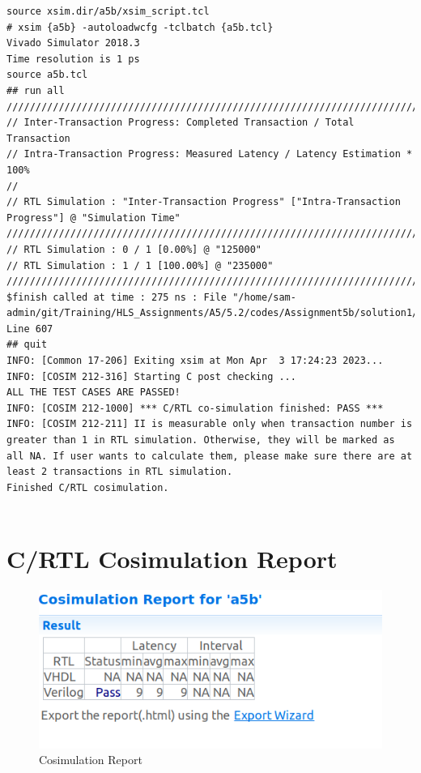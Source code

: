 \documentclass{article}
\begin{document}
\begin{lstlisting}
source xsim.dir/a5b/xsim_script.tcl
# xsim {a5b} -autoloadwcfg -tclbatch {a5b.tcl}
Vivado Simulator 2018.3
Time resolution is 1 ps
source a5b.tcl
## run all
////////////////////////////////////////////////////////////////////////////////////
// Inter-Transaction Progress: Completed Transaction / Total Transaction
// Intra-Transaction Progress: Measured Latency / Latency Estimation * 100%
//
// RTL Simulation : "Inter-Transaction Progress" ["Intra-Transaction Progress"] @ "Simulation Time"
////////////////////////////////////////////////////////////////////////////////////
// RTL Simulation : 0 / 1 [0.00%] @ "125000"
// RTL Simulation : 1 / 1 [100.00%] @ "235000"
////////////////////////////////////////////////////////////////////////////////////
$finish called at time : 275 ns : File "/home/sam-admin/git/Training/HLS_Assignments/A5/5.2/codes/Assignment5b/solution1/sim/verilog/a5b.autotb.v" Line 607
## quit
INFO: [Common 17-206] Exiting xsim at Mon Apr  3 17:24:23 2023...
INFO: [COSIM 212-316] Starting C post checking ...
ALL THE TEST CASES ARE PASSED!
INFO: [COSIM 212-1000] *** C/RTL co-simulation finished: PASS ***
INFO: [COSIM 212-211] II is measurable only when transaction number is greater than 1 in RTL simulation. Otherwise, they will be marked as all NA. If user wants to calculate them, please make sure there are at least 2 transactions in RTL simulation.
Finished C/RTL cosimulation.


\end{lstlisting}

\section{C/RTL Cosimulation Report}
\vspace{1cm}
\begin{figure}[h]
    \centering
\includegraphics[width=\columnwidth]{figs/4.png}
    \caption{Cosimulation Report}
    \label{fig:my_label}
\end{figure}
\end{document}

